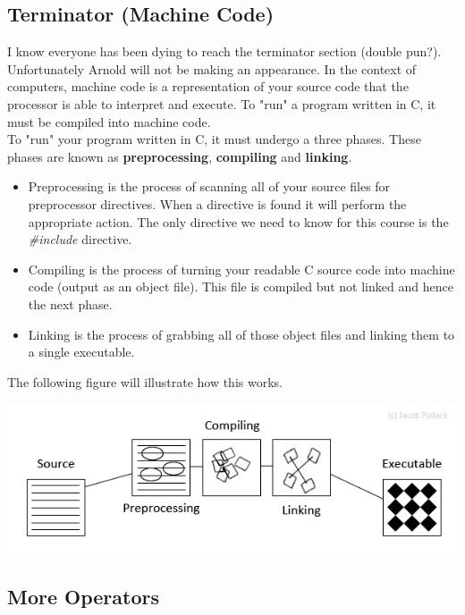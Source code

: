 \documentclass[12pt,extarticle]{article}
\begin{document}
\subsection{Terminator (Machine Code)}

I know everyone has been dying to reach the terminator section (double pun?). Unfortunately Arnold will not be making an appearance. In the context of computers, machine code is a representation of your source code that the processor is able to interpret and execute. To "run" a program written in C, it must be compiled into machine code.\\

To "run" your program written in C, it must undergo a three phases. These phases are known as \textbf{preprocessing}, \textbf{compiling} and \textbf{linking}.

\begin{itemize}

\item Preprocessing is the process of scanning all of your source files for preprocessor directives. When a directive is found it will perform the appropriate action. The only directive we need to know for this course is the \emph{\#include} directive.
\item Compiling is the process of turning your readable C source code into machine code (output as an object file). This file is compiled but not linked and hence the next phase.
\item Linking is the process of grabbing all of those object files and linking them to a single executable.

\end{itemize}

The following figure will illustrate how this works.\\

\begin{center}
\includegraphics[scale=0.5]{terminator_figure.png}
\end{center}

\subsection{More Operators}
\end{document}
